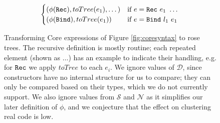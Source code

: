 \begin{figure}
\begin{align*}
\begin{cases}
      (\phi(\texttt{Rec}),     toTree(e_1), \dots)                         & \text{if $e = \texttt{Rec}\ e_1\ \dots$} \\
      (\phi(\texttt{Bind}),    toTree(e_1))                                & \text{if $e = \texttt{Bind}\ l_1\ e_1$}
    \end{cases}
  \end{align*}
  \caption{Transforming Core expressions of Figure \ref{fig:coresyntax} to rose trees. The recursive definition is mostly routine; each repeated element (shown as $\dots$) has an example to indicate their handling, e.g. for $\texttt{Rec}$ we apply $toTree$ to each $e_i$. We ignore values of $\mathcal{D}$, since constructors have no internal structure for us to compare; they can only be compared based on their types, which we do not currently support. We also ignore values from $\mathcal{S}$ and $\mathcal{N}$ as it simplifies our later definition of $\phi$, and we conjecture that the effect on clustering real code is low.}
  \label{fig:totree}
\end{figure}

